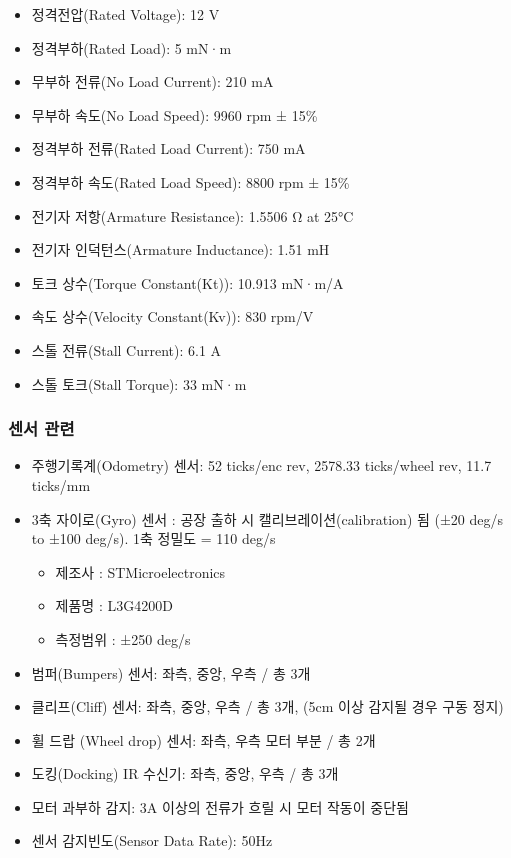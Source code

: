 \begin{itemize}[leftmargin=*]
\item 정격전압(Rated Voltage): 12 V
\item 정격부하(Rated Load): 5 mN·m
\item 무부하 전류(No Load Current): 210 mA
\item 무부하 속도(No Load Speed): 9960 rpm ± 15\%
\item 정격부하 전류(Rated Load Current): 750 mA
\item 정격부하 속도(Rated Load Speed): 8800 rpm ± 15\%
\item 전기자 저항(Armature Resistance): 1.5506 Ω at 25°C
\item 전기자 인덕턴스(Armature Inductance): 1.51 mH
\item 토크 상수(Torque Constant(Kt)): 10.913 mN·m/A
\item 속도 상수(Velocity Constant(Kv)): 830 rpm/V
\item 스톨 전류(Stall Current): 6.1 A
\item 스톨 토크(Stall Torque): 33 mN·m
\end{itemize}

\subsubsection{센서 관련}

\begin{itemize}[leftmargin=*]
\item 주행기록계(Odometry) 센서: 52 ticks/enc rev, 2578.33 ticks/wheel rev, 11.7 ticks/mm
\item 3축 자이로(Gyro) 센서
: 공장 출하 시 캘리브레이션(calibration) 됨 (±20 deg/s to ±100 deg/s). 1축 정밀도 = 110 deg/s
  \begin{itemize}
  \item 제조사 : STMicroelectronics
  \item 제품명 : L3G4200D
  \item 측정범위 : ±250 deg/s
  \end{itemize}
\item 범퍼(Bumpers) 센서: 좌측, 중앙, 우측 / 총 3개
\item 클리프(Cliff) 센서: 좌측, 중앙, 우측 / 총 3개, (5cm 이상 감지될 경우 구동 정지)
\item 휠 드랍 (Wheel drop) 센서: 좌측, 우측 모터 부분 / 총 2개
\item 도킹(Docking) IR 수신기: 좌측, 중앙, 우측 / 총 3개
\item 모터 과부하 감지: 3A 이상의 전류가 흐릴 시 모터 작동이 중단됨
\item 센서 감지빈도(Sensor Data Rate): 50Hz
\end{itemize}

